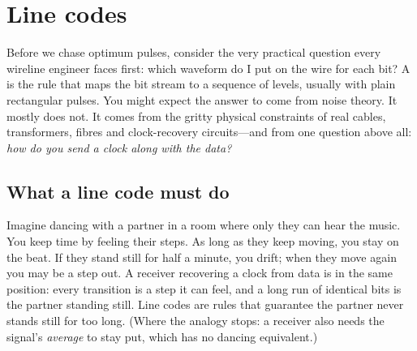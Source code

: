 \section{Line codes}
\label{sec:ch08:linecodes}

Before we chase optimum pulses, consider the very practical question every wireline engineer
faces first: which waveform do I put on the wire for each bit? A  is the
rule that maps the bit stream to a sequence of levels, usually with plain rectangular pulses.
You might expect the answer to come from noise theory. It mostly does not. It comes from the
gritty physical constraints of real cables, transformers, fibres and clock-recovery
circuits---and from one question above all: \emph{how do you send a clock along with the
data?}



\subsection{What a line code must do}

\begin{analogy}
Imagine dancing with a partner in a room where only they can hear the music. You keep time by
feeling their steps. As long as they keep moving, you stay on the beat. If they stand still
for half a minute, you drift; when they move again you may be a step out. A receiver
recovering a clock from data is in the same position: every transition is a step it can feel,
and a long run of identical bits is the partner standing still. Line codes are rules that
guarantee the partner never stands still for too long. (Where the analogy stops: a receiver
also needs the signal's \emph{average} to stay put, which has no dancing equivalent.)
\end{analogy}


